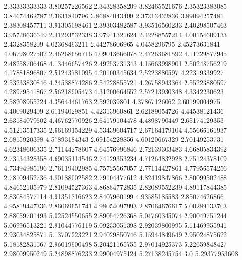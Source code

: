   2.33333333333    3.80257226562
  2.34328358209    3.82465521676
  2.35323383085    3.84674462787
   2.3631840796    3.86884043499
  2.37313432836    3.89094257481
  2.38308457711    3.91305098461
  2.39303482587    3.93516560233
  2.40298507463    3.95728636649
  2.41293532338    3.97941321624
  2.42288557214    4.00154609133
   2.4328358209    4.02368493211
  2.44278606965     4.0458296795
  2.45273631841    4.06798027502
  2.46268656716    4.09013666078
  2.47263681592    4.11229877945
  2.48258706468    4.13446657426
  2.49253731343    4.15663998901
  2.50248756219    4.17881896807
  2.51243781095    4.20100345634
   2.5223880597    4.22319339927
  2.53233830846    4.24538874286
  2.54228855721    4.26758943364
  2.55223880597    4.28979541867
  2.56218905473    4.31200664552
  2.57213930348     4.3342230623
  2.58208955224    4.35644461763
    2.592039801    4.37867126062
  2.60199004975     4.4009029409
  2.61194029851    4.42313960861
  2.62189054726    4.44538121436
  2.63184079602    4.46762770926
  2.64179104478     4.4898790449
  2.65174129353    4.51213517335
  2.66169154229    4.53439604717
  2.67164179104    4.55666161937
   2.6815920398    4.57893184343
  2.69154228856    4.60120667329
  2.70149253731    4.62348606335
  2.71144278607    4.64576996846
  2.72139303483    4.66805834392
  2.73134328358    4.69035114546
  2.74129353234    4.71264832928
  2.75124378109    4.73494985196
  2.76119402985    4.75725567057
  2.77114427861    4.77956574256
  2.78109452736    4.80188002582
  2.79104477612    4.82419847866
  2.80099502488    4.84652105979
  2.81094527363    4.86884772835
  2.82089552239    4.89117844385
  2.83084577114    4.91351316623
   2.8407960199    4.93585185583
  2.85074626866    4.95819447336
  2.86069651741    4.98054097993
  2.87064676617    5.00289133703
  2.88059701493    5.02524550655
  2.89054726368    5.04760345074
  2.90049751244    5.06996513221
  2.91044776119    5.09233051398
  2.92039800995    5.11469955941
  2.93034825871    5.13707223221
  2.94029850746    5.15944849649
  2.95024875622    5.18182831667
  2.96019900498    5.20421165755
  2.97014925373    5.22659848427
  2.98009950249    5.24898876233
  2.99004975124    5.27138245754
            3.0    5.29377953608
